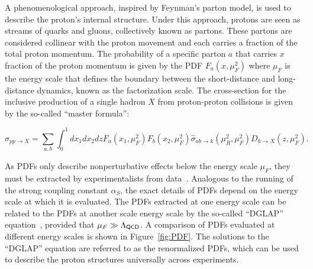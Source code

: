 A phenomenological approach, inspired by Feynman's parton model, is used to describe the proton's internal structure. Under this approach, protons are seen as streams of quarks and gluons, collectively known as partons. These partons are considered collinear with the proton movement and each carries a fraction of the total proton momentum. The probability of a specific parton $a$ that carries $x$ fraction of the proton momentum is given by the \ac{PDF} $F_{a}(x,\mu_{F}^2)$ where $\mu_{F}$ is the energy scale that defines the boundary between the short-distance and long-distance dynamics, known as the factorization scale. The cross-section for the inclusive production of a single hadron $X$ from proton-proton collisions is given by the so-called ``master formula'':

\begin{equation}
\label{eq:master}
\sigma_{pp\rightarrow X}=\sum_{a,b}\int_{0}^{1}dx_{1}dx_{2}dzF_{a}(x_{1},\mu_{F}^2)F_{b}(x_{2},\mu_{F}^2)\hat{\sigma}_{ab\rightarrow k}(\mu_{R}^2,\mu_{F}^2)D_{k\rightarrow X}(z,\mu_{F}^2).
\end{equation} 

As \acp{PDF} only describe nonperturbative effects below the energy scale $\mu_{F}$, they must be extracted by experimentalists from data~\cite{NNPDF:2014otw,NNPDF:2017mvq}. Analogous to the running of the strong coupling constant $\alpha_{S}$, the exact details of \acp{PDF} depend on the energy scale at which it is evaluated. The \acp{PDF} extracted at one energy scale can be related to the \acp{PDF} at another scale energy scale by the so-called ``DGLAP'' equation~\cite{Gribov:1971zn,Altarelli:1977zs,Dokshitzer:1977sg}, provided that $\mu_{F}\gg\mathrm{\mathrm{\Lambda}_{\textsf{QCD}}}$. A comparison of \acp{PDF} evaluated at different energy scales is shown in Figure~\ref{fig:PDF}. The solutions to the ``DGLAP'' equation are referred to as the renormalized \acp{PDF}, which can be used to describe the proton structures universally across experiments. 


